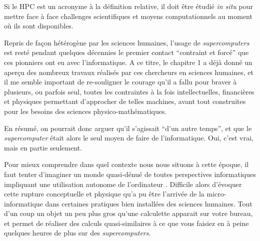 



Si le HPC est un acronyme à la définition relative, il doit être étudié \textit{in situ} pour mettre face à face challenges scientifiques et moyens computationnels au moment où ils sont disponibles.



Repris de façon hétérogène par les sciences humaines, l’usage de \textit{supercomputers} est resté pendant quelques décennies le premier contact \enquote{contraint et forcé} que ces pionniers ont eu avec l'informatique. A ce titre, le chapitre 1 a déjà donné un aperçu des nombreux travaux réalisés par ces chercheurs en sciences humaines, et il me semble important de re-souligner le courage qu'il a fallu pour braver à plusieurs, ou parfois seul, toutes les contraintes à la fois intellectuelles, financières et physiques permettant d'approcher de telles machines, avant tout construites pour les besoins des sciences physico-mathématiques.

En résumé, on pourrait donc arguer qu'il s'agissait \enquote{d'un autre temps}, et que le \textit{supercomputer} était alors le seul moyen de faire de l'informatique. Oui, c'est vrai, mais en partie seulement.

Pour mieux comprendre dans quel contexte nous nous situons à cette époque, il faut tenter d'imaginer un monde quasi-dénué de toutes perspectives informatiques impliquant une utilisation autonome de l'ordinateur . Difficile alors d'évoquer cette rupture conceptuelle et physique qu'a pu être l'arrivée de la micro-informatique dans certaines pratiques bien installées des sciences humaines. Tout d'un coup un objet un peu plus gros qu'une calculette apparait sur votre bureau, et permet de réaliser des calculs quasi-similaires à ce que vous faisiez en à peine quelques heures de plus sur des \textit{supercomputers}.

